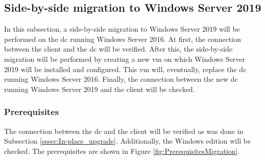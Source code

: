 \subsection{Side-by-side migration to Windows Server 2019}
In this subsection, a side-by-side migration to Windows Server 2019 will be performed on the \acrshort{dc} running Windows Server 2016. 
At first, the connection between the client and the \acrshort{dc} will be verified. 
After this, the side-by-side migration will be performed by creating a new \acrshort{vm} on which Windows Server 2019 will be installed and configured. 
This \acrshort{vm} will, eventually, replace the \acrshort{dc} running Windows Server 2016. 
Finally, the connection between the new  \acrshort{dc} running Windows Server 2019 and the client will be checked.

\subsubsection{Prerequisites}
The connection between the \acrshort{dc} and the client will be verified as was done in Subsection \ref{sssec:In-place_upgrade}.
Additionally, the Windows edition will be checked. 
The prerequisites are shown in Figure \ref{fig:PrerequisitesMigration}.

